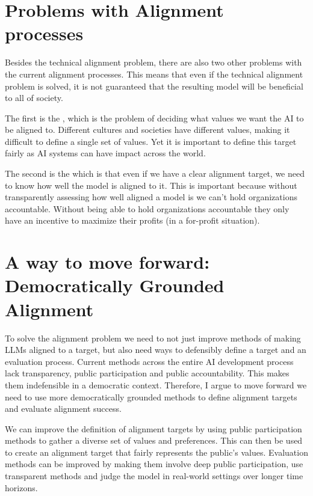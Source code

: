\section{Problems with Alignment processes}

Besides the technical alignment problem, there are also two other problems with the current alignment processes. This means that even if the technical alignment problem is solved, it is not guaranteed that the resulting model will be beneficial to all of society.

The first is the , which is the problem of deciding what values we want the AI to be aligned to. Different cultures and societies have different values, making it difficult to define a single set of values. Yet it is important to define this target fairly as AI systems can have impact across the world.

The second is the  which is that even if we have a clear alignment target, we need to know how well the model is aligned to it. This is important because without transparently assessing how well aligned a model is we can't hold organizations accountable. Without being able to hold organizations accountable they only have an incentive to  maximize their profits (in a for-profit situation).

\section{A way to move forward: Democratically Grounded Alignment}

To solve the alignment problem we need to not just improve methods of making LLMs aligned to a target, but also need ways to defensibly define a target and an evaluation process. Current methods across the entire AI development process lack transparency, public participation and public accountability. This makes them indefensible in a democratic context. Therefore, I argue to move forward we need to use more democratically grounded methods to define alignment targets and evaluate alignment success.

We can improve the definition of alignment targets by using public participation methods to gather a diverse set of values and preferences. This can then be used to create an alignment target that fairly represents the public's values. Evaluation methods can be improved by making them involve deep public participation, use transparent methods and judge the model in real-world settings over longer time horizons.

